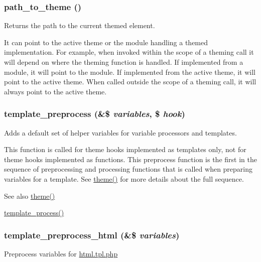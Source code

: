 \hypertarget{includes_2theme_8inc_a8fd73902b4d3a2d476e5b1324506b5e1}{
\subsubsection[{path\_\-to\_\-theme}]{\setlength{\rightskip}{0pt plus 5cm}path\_\-to\_\-theme ()}}
\label{includes_2theme_8inc_a8fd73902b4d3a2d476e5b1324506b5e1}
Returns the path to the current themed element.

It can point to the active theme or the module handling a themed implementation. For example, when invoked within the scope of a theming call it will depend on where the theming function is handled. If implemented from a module, it will point to the module. If implemented from the active theme, it will point to the active theme. When called outside the scope of a theming call, it will always point to the active theme. \hypertarget{includes_2theme_8inc_a3eeb7bcdba7ef4859f99586da264d347}{
\subsubsection[{template\_\-preprocess}]{\setlength{\rightskip}{0pt plus 5cm}template\_\-preprocess (\&\$ {\em variables}, \/  \$ {\em hook})}}
\label{includes_2theme_8inc_a3eeb7bcdba7ef4859f99586da264d347}
Adds a default set of helper variables for variable processors and templates.

This function is called for theme hooks implemented as templates only, not for theme hooks implemented as functions. This preprocess function is the first in the sequence of preprocessing and processing functions that is called when preparing variables for a template. See \hyperlink{includes_2theme_8inc_a7c25609a935874541a19657affd30fff}{theme()} for more details about the full sequence.

\begin{DoxySeeAlso}{See also}
\hyperlink{includes_2theme_8inc_a7c25609a935874541a19657affd30fff}{theme()} 

\hyperlink{includes_2theme_8inc_a9b4d56c55dab2c59b7af6f71d6b1a940}{template\_\-process()} 
\end{DoxySeeAlso}
\hypertarget{includes_2theme_8inc_a5bc9f37111330a160833274482ad866a}{
\subsubsection[{template\_\-preprocess\_\-html}]{\setlength{\rightskip}{0pt plus 5cm}template\_\-preprocess\_\-html (\&\$ {\em variables})}}
\label{includes_2theme_8inc_a5bc9f37111330a160833274482ad866a}
Preprocess variables for \hyperlink{html_8tpl_8php}{html.tpl.php}

